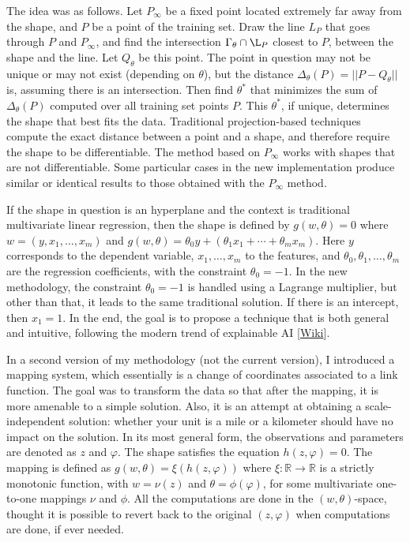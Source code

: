 \documentclass[oneside,10pt]{book}
\begin{document}
The idea was as follows. Let $P_\infty$ be a fixed point located extremely far away from the shape, and $P$ be a point of the \textcolor{index}{training set}. Draw the line
 $L_P$ that goes through $P$ and $P_\infty$, and find the intersection $\Gamma_\theta \cap \L_P$ closest to $P$, between the shape and the line. Let $Q_\theta$ be this point. The point in question may not be unique or may not exist (depending on $\theta$), but the distance $\Delta_\theta(P)=||P-Q_\theta||$ is, assuming there is an intersection. Then find $\theta^*$ that 
minimizes the sum of $\Delta_\theta(P)$ computed over all training set points $P$. This $\theta^*$, if unique, determines the shape that best fits the data. Traditional projection-based techniques compute the exact distance between a point and a shape, and therefore require the shape to be differentiable. The method based on
 $P_\infty$ works with shapes that are not differentiable. Some particular cases in the new implementation produce similar or identical results to those obtained with the $P_\infty$ method.

If the shape in question is an hyperplane and the context is traditional multivariate linear regression, then the shape is defined by 
$g(w,\theta)=0$ where $w=(y,x_1,\dots,x_m)$ and $g(w,\theta)=\theta_0 y+(\theta_1 x_1+\cdots +\theta_m x_m)$. Here $y$ corresponds to the dependent variable, $x_1,\dots, x_m$ to the features, and $\theta_0, \theta_1,\dots,\theta_m$ are the regression coefficients, with the constraint 
$\theta_0=-1$. In the new methodology, the constraint $\theta_0=-1$ is handled using a Lagrange multiplier, but other than that, it leads to the same traditional solution. If there is an intercept, then $x_1=1$. In the end, the goal is to propose a technique that is both general and intuitive,
 following the modern trend of \textcolor{index}{explainable AI} [\href{https://en.wikipedia.org/wiki/Explainable_artificial_intelligence}{Wiki}].

In a second version of my methodology (not the current version), I introduced a mapping system, which essentially is a change of coordinates 
 associated to a link function. The
 goal was to transform the data so that after the mapping, it is more amenable to a simple solution. Also, it is an attempt at
 obtaining a scale-independent solution: whether your unit is a mile or a kilometer should have no impact on the solution. In its most general form, the observations and parameters are denoted as $z$ and $\varphi$. The shape satisfies the equation $h(z,\varphi)=0$. The mapping is defined as 
$g(w,\theta)=\xi(h(z,\varphi))$ where $\xi : \mathbb{R} \rightarrow \mathbb{R}$ is a strictly monotonic function, with $w=\nu(z)$ and $\theta
 = \phi(\varphi)$, for some multivariate one-to-one mappings $\nu$ and $\phi$. All the computations are done in the $(w,\theta)$-space, thought it is possible to revert back to the original $(z,\varphi)$ when computations are done, if ever needed. 
\end{document}
